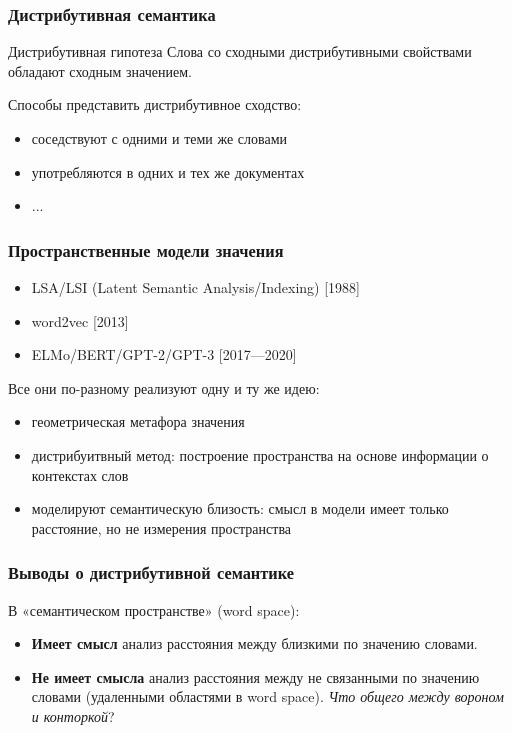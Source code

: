 \documentclass[10pt,svgnames]{beamer}
\begin{document}
\begin{frame}
  \frametitle{Дистрибутивная семантика}
  \begin{block}{Дистрибутивная гипотеза}
    Слова со сходными дистрибутивными свойствами обладают сходным значением.
  \end{block}
  Способы представить дистрибутивное сходство:
  \begin{itemize}
  \item соседствуют с одними и теми же словами
  \item употребляются в одних и тех же документах
  \item ...
  \end{itemize}
\end{frame}


\begin{frame}
  \frametitle{Пространственные модели значения}
  \begin{itemize}
  \item LSA/LSI (Latent Semantic Analysis/Indexing) [1988]
  \item word2vec [2013]
  \item ELMo/BERT/GPT-2/GPT-3 [2017—2020]
  \end{itemize}
  Все они по-разному реализуют одну и ту же идею:
  \begin{itemize}
  \item геометрическая метафора значения
  \item дистрибуитвный метод: построение пространства на основе
    информации о контекстах слов
  \item моделируют семантическую близость: смысл в модели имеет только расстояние, но не измерения пространства
  \end{itemize}
\end{frame}

\begin{frame}
  \frametitle{Выводы о дистрибутивной семантике}
  В «семантическом пространстве» (word space):
  \begin{itemize}
  \item \textbf{Имеет смысл} анализ расстояния между \alert{близкими} по значению словами.
  \item \textbf{Не имеет смысла} анализ расстояния между не связанными по
    значению словами (удаленными областями в word space).
    \textit{Что общего между вороном и конторкой}?
  \end{itemize}
\end{frame}
\end{document}
